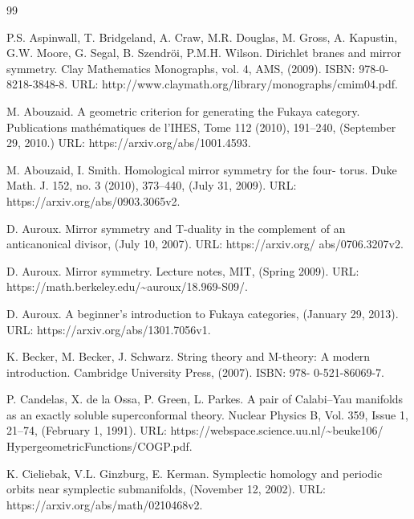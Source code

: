 
\begin{thebibliography}{99}

 P.S. Aspinwall, T. Bridgeland, A. Craw, M.R. Douglas, M. Gross, A. Kapustin, G.W. Moore, G. Segal, B. Szendröi, P.M.H. Wilson. Dirichlet branes and mirror symmetry. Clay Mathematics Monographs, vol. 4, AMS, (2009). ISBN: 978-0-8218-3848-8. URL: http://www.claymath.org/library/monographs/cmim04.pdf.

 M. Abouzaid. A geometric criterion for generating the Fukaya category. Publications mathématiques de l’IHES, Tome 112 (2010), 191–240, (September 29, 2010.) URL: https://arxiv.org/abs/1001.4593.

 M. Abouzaid, I. Smith. Homological mirror symmetry for the four- torus. Duke Math. J. 152, no. 3 (2010), 373–440, (July 31, 2009). URL: https://arxiv.org/abs/0903.3065v2.

 D. Auroux. Mirror symmetry and T-duality in the complement of an anticanonical divisor, (July 10, 2007). URL: https://arxiv.org/ abs/0706.3207v2.

 D. Auroux. Mirror symmetry. Lecture notes, MIT, (Spring 2009). URL: https://math.berkeley.edu/\textasciitilde{}auroux/18.969-S09/.

 D. Auroux. A beginner’s introduction to Fukaya categories, (January 29, 2013). URL: https://arxiv.org/abs/1301.7056v1.

 K. Becker, M. Becker, J. Schwarz. String theory and M-theory: A modern introduction. Cambridge University Press, (2007). ISBN: 978- 0-521-86069-7.

 P. Candelas, X. de la Ossa, P. Green, L. Parkes. A pair of Calabi–Yau manifolds as an exactly soluble superconformal theory. Nuclear Physics B, Vol. 359, Issue 1, 21–74, (February 1, 1991). URL: https://webspace.science.uu.nl/\textasciitilde{}beuke106/ HypergeometricFunctions/COGP.pdf.

 K. Cieliebak, V.L. Ginzburg, E. Kerman. Symplectic homology and periodic orbits near symplectic submanifolds, (November 12, 2002). URL: https://arxiv.org/abs/math/0210468v2.


\end{thebibliography}
